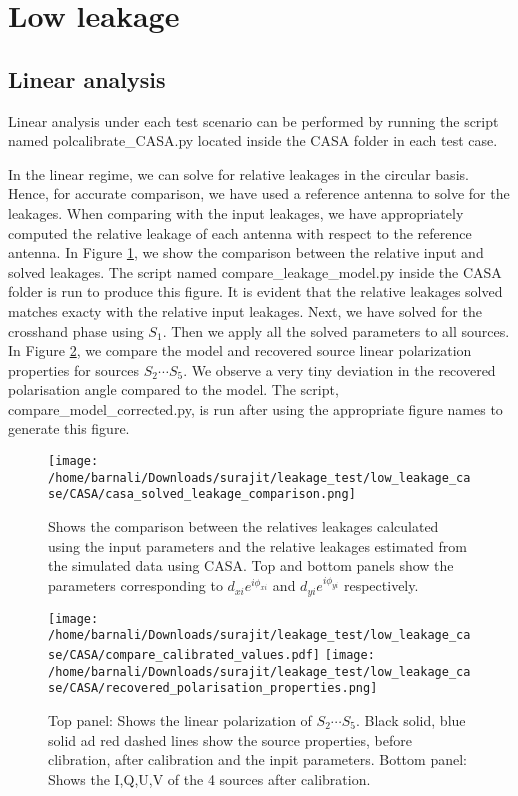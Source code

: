 \documentclass{article}
\begin{document}
\section{Low leakage}

\subsection{Linear analysis}

Linear analysis under each test scenario can be performed by running the script named polcalibrate\_CASA.py located inside the CASA folder in each test case.

In the linear regime, we can solve for relative leakages in the circular basis.  Hence, for accurate comparison, we have used a reference antenna to solve for the leakages. When comparing with the input leakages, we have appropriately computed the relative leakage of each antenna with respect to the reference antenna. In Figure \ref{fig:linear_CASA_leak_comparison}, we show the comparison between the relative input and solved leakages. The script named compare\_leakage\_model.py inside the CASA folder is run to produce this figure. It is evident that the relative leakages solved matches exacty with the relative input leakages. Next, we have solved for the crosshand phase using $S_1$. Then we apply all the solved parameters to all sources. In Figure \ref{fig:compare_input_output_source_params}, we compare the model and recovered source linear polarization properties for sources $S_2\cdots S_5$. We observe a very tiny deviation in the recovered polarisation angle compared to the model. The script, compare\_model\_corrected.py, is run after using the appropriate figure names to generate this figure.

\begin{figure}
\centering
\texttt{[image: /home/barnali/Downloads/surajit/leakage\_test/low\_leakage\_case/CASA/casa\_solved\_leakage\_comparison.png]}
\caption{Shows the comparison between the relatives leakages calculated using the input parameters and the relative leakages estimated from the simulated data using CASA. Top and bottom panels show the parameters corresponding to $d_{xi}e^{i\phi_{xi}}$ and $d_{yi}e^{i\phi_{yi}}$ respectively. }
\label{fig:linear_CASA_leak_comparison}
\end{figure} 

\begin{figure}
\centering
\texttt{[image: /home/barnali/Downloads/surajit/leakage\_test/low\_leakage\_case/CASA/compare\_calibrated\_values.pdf]}
\texttt{[image: /home/barnali/Downloads/surajit/leakage\_test/low\_leakage\_case/CASA/recovered\_polarisation\_properties.png]}
\caption{Top panel: Shows the linear polarization of $S_2\cdots S_5$. Black solid, blue solid ad red dashed lines show the source properties, before clibration, after calibration and the inpit parameters. Bottom panel: Shows the I,Q,U,V of the 4 sources after calibration.}
\label{fig:compare_input_output_source_params}
\end{figure}
\end{document}
